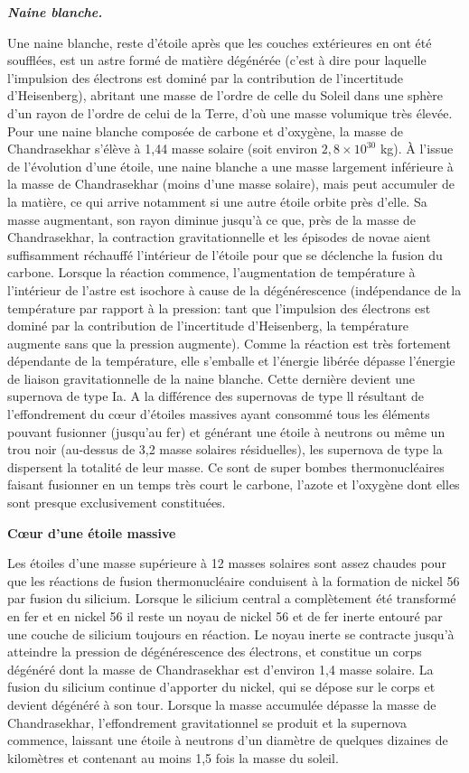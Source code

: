 \documentclass{book}
\begin{document}
{ \it
{\bf Naine blanche.}

Une naine blanche, reste d'étoile après que les couches extérieures en ont été soufflées, est un astre formé de matière dégénérée (c'est à dire pour laquelle l'impulsion des électrons est dominé par la contribution de l'incertitude d'Heisenberg), 
abritant une masse de l'ordre de celle du Soleil dans une sphère d'un rayon de l'ordre de celui de la Terre, d'où une masse volumique très élevée. 
Pour une naine blanche composée de carbone et d'oxygène, la masse de Chandrasekhar s'élève à 1,44 masse solaire (soit environ $2,8 \times 10^{30}$ kg). 
À l'issue de l'évolution d'une étoile, une naine blanche a une masse largement inférieure à la masse de Chandrasekhar (moins d'une masse solaire), mais peut accumuler de la matière, ce qui arrive notamment si une autre étoile orbite près d'elle. Sa masse augmentant, son rayon diminue jusqu'à ce que, près de la masse de Chandrasekhar, la contraction gravitationnelle et les épisodes de novae aient suffisamment réchauffé l'intérieur de l'étoile pour que se déclenche la fusion du carbone. Lorsque la réaction commence, l'augmentation de température à l'intérieur de l'astre est isochore à cause de la dégénérescence (indépendance de la température par rapport à la pression: tant que l'impulsion des électrons est dominé par la contribution de l'incertitude d'Heisenberg, la température augmente sans que la pression augmente). 
Comme la réaction est très fortement dépendante de la température, elle s'emballe et l'énergie libérée dépasse l'énergie de liaison gravitationnelle de la naine blanche. Cette dernière devient une supernova de type Ia. A la différence des supernovas de type ll résultant de l'effondrement du cœur d'étoiles massives ayant consommé tous les éléments pouvant fusionner (jusqu'au fer) et générant une étoile à neutrons ou même un trou noir (au-dessus de 3,2 masse solaires résiduelles), les supernova de type la dispersent la totalité de leur masse. Ce sont de super bombes thermonucléaires faisant fusionner en un temps très court le carbone, l'azote et l'oxygène dont elles sont presque exclusivement constituées.

{\bf  Cœur d'une étoile massive}

Les étoiles d'une masse supérieure à 12 masses solaires sont assez chaudes pour que les réactions de fusion thermonucléaire conduisent à la formation de nickel 56 par fusion du silicium. Lorsque le silicium central a complètement été transformé en fer et en nickel 56 il reste un noyau de nickel 56 et de fer inerte entouré par une couche de silicium toujours en réaction. Le noyau inerte se contracte jusqu'à atteindre la pression de dégénérescence des électrons, et constitue un corps dégénéré dont la masse de Chandrasekhar est d'environ 1,4 masse solaire. La fusion du silicium continue d'apporter du nickel, qui se dépose sur le corps et devient dégénéré à son tour. Lorsque la masse accumulée dépasse la masse de Chandrasekhar, l'effondrement gravitationnel se produit et la supernova commence, laissant une étoile à neutrons d'un diamètre de quelques dizaines de kilomètres et contenant au moins 1,5 fois la masse du soleil.
}
\end{document}
